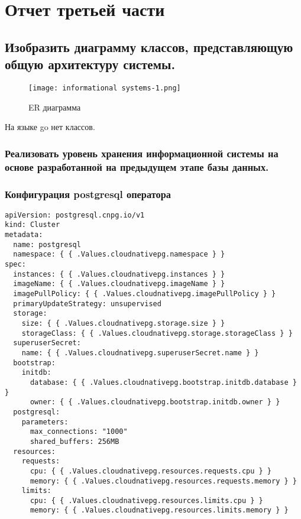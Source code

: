 \documentclass{article}
\begin{document}
\itmo[
      variant=Пасека,
      labn=3,
      discipline=Информационные системы,
      group=P3312,
      student=Соколов Анатолий Владимирович \\ Пархоменко Кирилл Александрович,
      teacher=Бострикова Дарья Константиновна
]
\lstset{language=java}
\tableofcontents

\section{Отчет третьей части}

\subsection{Изобразить диаграмму классов, представляющую общую архитектуру системы.}

\begin{figure}[H]
    \centering
    \texttt{[image: informational systems-1.png]}
    \caption{ER диаграмма}
    \label{fig:enter-label}
\end{figure}


На языке go нет классов.

\subsubsection{Реализовать уровень хранения информационной системы на основе разработанной на предыдущем этапе базы данных.}

\subsubsection{Конфигурация postgresql оператора}

\begin{lstlisting}
apiVersion: postgresql.cnpg.io/v1
kind: Cluster
metadata:
  name: postgresql
  namespace: { { .Values.cloudnativepg.namespace } }
spec:
  instances: { { .Values.cloudnativepg.instances } }
  imageName: { { .Values.cloudnativepg.imageName } }
  imagePullPolicy: { { .Values.cloudnativepg.imagePullPolicy } }
  primaryUpdateStrategy: unsupervised
  storage:
    size: { { .Values.cloudnativepg.storage.size } }
    storageClass: { { .Values.cloudnativepg.storage.storageClass } }
  superuserSecret:
    name: { { .Values.cloudnativepg.superuserSecret.name } }
  bootstrap:
    initdb:
      database: { { .Values.cloudnativepg.bootstrap.initdb.database } }
      owner: { { .Values.cloudnativepg.bootstrap.initdb.owner } }
  postgresql:
    parameters:
      max_connections: "1000"
      shared_buffers: 256MB
  resources:
    requests:
      cpu: { { .Values.cloudnativepg.resources.requests.cpu } }
      memory: { { .Values.cloudnativepg.resources.requests.memory } }
    limits:
      cpu: { { .Values.cloudnativepg.resources.limits.cpu } }
      memory: { { .Values.cloudnativepg.resources.limits.memory } }
\end{lstlisting}
\end{document}
